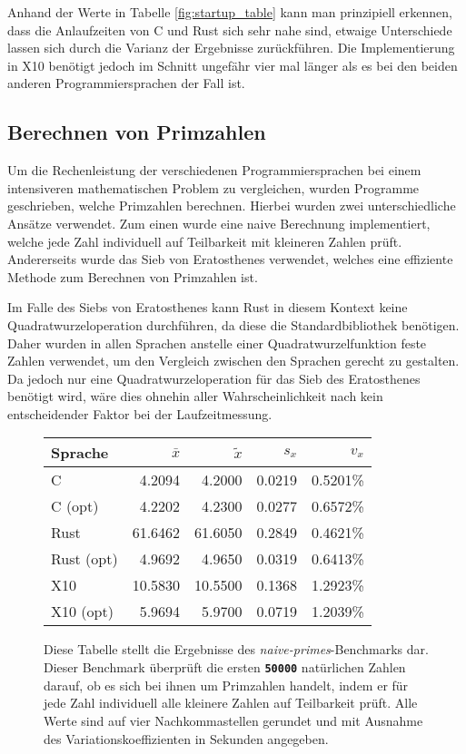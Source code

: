 Anhand der Werte in Tabelle \ref{fig:startup_table} kann man prinzipiell erkennen,
dass die Anlaufzeiten von C und Rust sich sehr nahe sind, etwaige Unterschiede lassen sich durch die Varianz der
Ergebnisse zurückführen. Die Implementierung in X10 benötigt jedoch im Schnitt ungefähr vier mal länger als es bei 
den beiden anderen Programmiersprachen der Fall ist. 


\subsection{Berechnen von Primzahlen}\label{sec:primes_calc}

Um die Rechenleistung der verschiedenen Programmiersprachen bei einem intensiveren mathematischen Problem zu 
vergleichen, wurden Programme geschrieben, welche Primzahlen berechnen.
Hierbei wurden zwei unterschiedliche Ansätze verwendet. Zum einen wurde
eine naive Berechnung implementiert, welche jede Zahl individuell auf Teilbarkeit mit kleineren Zahlen prüft. 
Andererseits wurde das Sieb von Eratosthenes verwendet, welches eine effiziente Methode zum Berechnen von Primzahlen
ist.

Im Falle des Siebs von Eratosthenes kann Rust in diesem Kontext keine Quadratwurzeloperation durchführen,
da diese die Standardbibliothek benötigen. Daher wurden in allen Sprachen anstelle einer Quadratwurzelfunktion
feste Zahlen verwendet, um den Vergleich zwischen den Sprachen gerecht zu gestalten.
Da jedoch nur eine Quadratwurzeloperation für das Sieb des Eratosthenes
benötigt wird, wäre dies ohnehin aller Wahrscheinlichkeit nach kein entscheidender Faktor bei der Laufzeitmessung.

\begin{figure}[hb]
	\begin{center}
		\begin{tabular}{lrrrr}
			\toprule
			Sprache    & $\bar{x}$ & $\tilde{x}$ & $s_x$ & $v_x$   \\
			\midrule
			C          &  4.2094  &  4.2000 & 0.0219 & 0.5201\% \\
			C (opt)    &  4.2202  &  4.2300 & 0.0277 & 0.6572\% \\
			Rust       & 61.6462  & 61.6050 & 0.2849 & 0.4621\% \\
			Rust (opt) &  4.9692  &  4.9650 & 0.0319 & 0.6413\% \\
			X10        & 10.5830  & 10.5500 & 0.1368 & 1.2923\% \\
			X10 (opt)  &  5.9694  &  5.9700 & 0.0719 & 1.2039\% \\
			\bottomrule
		\end{tabular}
	\end{center}
	\caption{
		Diese Tabelle stellt die Ergebnisse des \textit{naive-primes}-Benchmarks dar.
		Dieser Benchmark überprüft die ersten \texttt{\textsc{\textbf{50000}}} natürlichen Zahlen darauf,
		ob es sich bei ihnen um Primzahlen handelt,
		indem er für jede Zahl individuell alle kleinere Zahlen auf Teilbarkeit prüft.
		Alle Werte sind auf vier Nachkommastellen gerundet und mit Ausnahme des Variationskoeffizienten
		in Sekunden angegeben.
	}
	\label{fig:primes_naive_table}
\end{figure}

